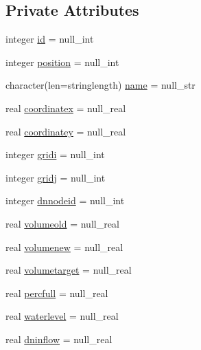 \subsection*{Private Attributes}
\begin{DoxyCompactItemize}
\item 
integer \mbox{\hyperlink{structmodulereservoirs_1_1t__reservoir_ae65843d364a214f5286c34ac48740ddd}{id}} = null\+\_\+int
\item 
integer \mbox{\hyperlink{structmodulereservoirs_1_1t__reservoir_ad21dd2b2b58469a8c43cc672f31e102d}{position}} = null\+\_\+int
\item 
character(len=stringlength) \mbox{\hyperlink{structmodulereservoirs_1_1t__reservoir_a25f1c139b8ea48ace7dbcd5bd2bd4ae2}{name}} = null\+\_\+str
\item 
real \mbox{\hyperlink{structmodulereservoirs_1_1t__reservoir_a1f646046122b844f8d120be445ea5cbf}{coordinatex}} = null\+\_\+real
\item 
real \mbox{\hyperlink{structmodulereservoirs_1_1t__reservoir_a63b72f2bc234f1bab245cb3e921beddd}{coordinatey}} = null\+\_\+real
\item 
integer \mbox{\hyperlink{structmodulereservoirs_1_1t__reservoir_a568a4deb8abf364e7d168ae869032c7d}{gridi}} = null\+\_\+int
\item 
integer \mbox{\hyperlink{structmodulereservoirs_1_1t__reservoir_a7664c76974dd2385670bb8e7b2ef8a12}{gridj}} = null\+\_\+int
\item 
integer \mbox{\hyperlink{structmodulereservoirs_1_1t__reservoir_a30c90dd68555e47c9c2f0a6214e3dd5f}{dnnodeid}} = null\+\_\+int
\item 
real \mbox{\hyperlink{structmodulereservoirs_1_1t__reservoir_a91df7d1e7b89831281f4c8aa119c5ef3}{volumeold}} = null\+\_\+real
\item 
real \mbox{\hyperlink{structmodulereservoirs_1_1t__reservoir_a23114062cf5cd927c8a0084a6370fa12}{volumenew}} = null\+\_\+real
\item 
real \mbox{\hyperlink{structmodulereservoirs_1_1t__reservoir_abef2194bf538a4fb2db13e34a832d81c}{volumetarget}} = null\+\_\+real
\item 
real \mbox{\hyperlink{structmodulereservoirs_1_1t__reservoir_acfd03f34ad080479727dc68113472619}{percfull}} = null\+\_\+real
\item 
real \mbox{\hyperlink{structmodulereservoirs_1_1t__reservoir_a564ebafde0282509d5872597fe08abe4}{waterlevel}} = null\+\_\+real
\item 
real \mbox{\hyperlink{structmodulereservoirs_1_1t__reservoir_a16496fd813248a56abc4f6333f69dd6e}{dninflow}} = null\+\_\+real

\end{DoxyCompactItemize}
